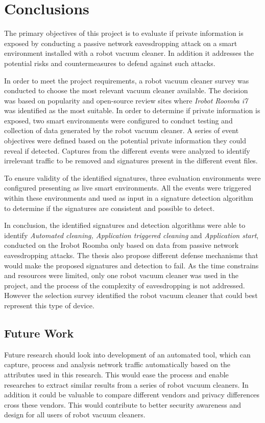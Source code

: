 \chapter{Conclusions}
The primary objectives of this  project is to evaluate if private information is exposed by conducting a passive network eavesdropping attack on a smart environment installed with a robot vacuum cleaner. In addition it addresses the potential risks and countermeasures to defend against such attacks.

In order to meet the project requirements, a robot vacuum cleaner survey was conducted to choose the most relevant vacuum cleaner available. The decision was based on popularity and open-source review sites where \textit{Irobot Roomba i7} was identified as the most suitable. In order to determine if private information is exposed, two smart environments were configured to conduct testing and collection of data generated by the robot vacuum cleaner. A series of event objectives were defined based on the potential private information they could reveal if detected. Captures from the different events were analyzed to identify irrelevant traffic to be removed and signatures present in the different event files. 

To ensure validity of the identified signatures, three evaluation environments were configured presenting as live smart environments. All the events were triggered within these environments and used as input in a signature detection algorithm to determine if the signatures are consistent and possible to detect. 

In conclusion, the identified signatures and detection algorithms were able to identify \textit{Automated cleaning, Application triggered cleaning} and \textit{Application start}, conducted on the Irobot Roomba only based on data from passive network eavesdropping attacks. The thesis also propose different defense mechanisms that would make the proposed signatures and detection to fail. As the time constrains and resources were limited, only one robot vacuum cleaner was used in the project, and the process of the complexity of eavesdropping is not addressed. However the selection survey identified the robot vacuum cleaner that could best represent this type of device. 

\section{Future Work}
Future research should look into development of an automated tool, which can capture, process and analysis network traffic automatically based on the attributes used in this research. This would ease the process and enable researches to extract similar results from a series of robot vacuum cleaners. In addition it could be valuable to compare different vendors and privacy differences cross these vendors. This would contribute to better security awareness and design for all users of robot vacuum cleaners. 

